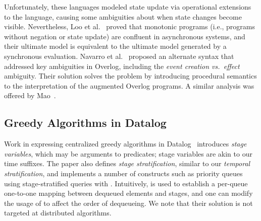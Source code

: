 Unfortunately, these languages modeled state update via operational extensions
to the language, causing some ambiguities about when state changes become
visible.  
Nevertheless, Loo et al.~\cite{Loo2009-CACM} proved that monotonic programs (i.e., programs
without negation or state update) are confluent in asynchronous systems, and
their ultimate model is equivalent to the ultimate model generated by a
synchronous evaluation.
Navarro et al.~\cite{navarro} proposed an alternate syntax that addressed key ambiguities in Overlog, including the
\emph{event creation vs.\ effect} ambiguity.  Their solution solves the problem by introducing procedural semantics to the interpretation of 
the augmented Overlog programs.  A similar analysis was offered by Mao~\cite{Mao2009}.

\subsection{Greedy Algorithms in Datalog}

Work in expressing centralized greedy algorithms in
Datalog~\cite{greedybychoice} introduces {\em stage variables}, which may be
arguments to predicates; stage variables are akin to our time suffixes.  The
paper also defines {\em stage stratification}, similar to our {\em temporal
stratification}, and implements a number of constructs such as priority queues
using stage-stratified queries with .  Intuitively,
 is used to establish a per-queue one-to-one mapping between
dequeued elements and stages, and one can modify the usage of 
to affect the order of dequeueing.  We note that their solution is not targeted
at distributed algorithms.


